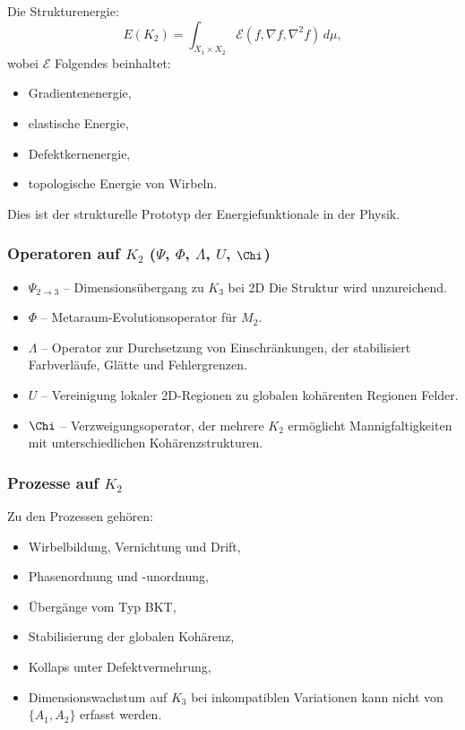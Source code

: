 Die Strukturenergie:
\[
E(K_2) = \int_{X_1 \times X_2}
\mathcal{E}(f, \nabla f, \nabla^2 f)\, d\mu,
\]
wobei $\mathcal{E}$ Folgendes beinhaltet:
\begin{itemize}
    \item Gradientenenergie,
    \item elastische Energie,
    \item Defektkernenergie,
    \item topologische Energie von Wirbeln.
\end{itemize}

Dies ist der strukturelle Prototyp der Energiefunktionale in der Physik.

\subsubsection{Operatoren auf \texorpdfstring{$K_2$}{K_2} (\texorpdfstring{$\Psi$}{\Psi}, \texorpdfstring{$\Phi$}{\Phi}, \texorpdfstring{$\Lambda$}{\Lambda}, \texorpdfstring{$U$}{U}, \texorpdfstring{$\Chi$}{\Chi})}

\begin{itemize}
    \item $\Psi_{2\to3}$ – Dimensionsübergang zu $K_3$ bei 2D
          Die Struktur wird unzureichend.
    \item $\Phi$ – Metaraum-Evolutionsoperator für $M_2$.
    \item $\Lambda$ – Operator zur Durchsetzung von Einschränkungen, der stabilisiert
          Farbverläufe, Glätte und Fehlergrenzen.
    \item $U$ – Vereinigung lokaler 2D-Regionen zu globalen kohärenten Regionen
          Felder.
    \item $\Chi$ – Verzweigungsoperator, der mehrere $K_2$ ermöglicht
          Mannigfaltigkeiten mit unterschiedlichen Kohärenzstrukturen.
\end{itemize}

\subsubsection{Prozesse auf \texorpdfstring{$K_2$}{K_2}}

Zu den Prozessen gehören:
\begin{itemize}
    \item Wirbelbildung, Vernichtung und Drift,
    \item Phasenordnung und -unordnung,
    \item Übergänge vom Typ BKT,
    \item Stabilisierung der globalen Kohärenz,
    \item Kollaps unter Defektvermehrung,
    \item Dimensionswachstum auf $K_3$ bei inkompatiblen Variationen
          kann nicht von $\{A_1, A_2\}$ erfasst werden.
\end{itemize}

